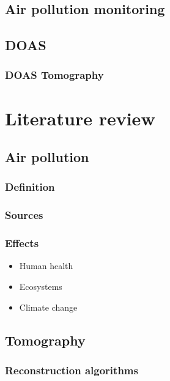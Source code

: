 \subsection{Air pollution monitoring}%
\label{sub:air_pollution_monitoring}

\subsection{DOAS}%
\label{sub:doas}

\subsubsection{DOAS Tomography}%
\label{ssub:doas_tomography}

\section{Literature review}%
\label{sec:literature_review}

\subsection{Air pollution}%
\label{sub:air_pollution}

\subsubsection{Definition}%
\label{ssub:definition}

\subsubsection{Sources}%
\label{ssub:sources}

\subsubsection{Effects}%
\label{ssub:effects}
\begin{itemize}
    \item Human health
    \item Ecosystems
    \item Climate change
\end{itemize}

\subsection{Tomography}%
\label{sub:tomography}

\subsubsection{Reconstruction algorithms}%
\label{ssub:reconstruction_algorithms}

